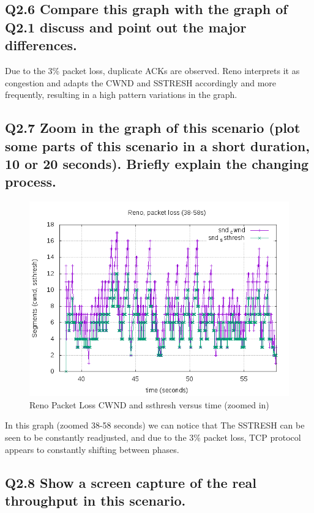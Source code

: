 \documentclass{article}
\begin{document}
\subsection{Q2.6 Compare this graph with the graph of Q2.1 discuss and point out the major differences.}

Due to the 3\% packet loss, duplicate ACKs are observed. Reno interprets it as congestion and adapts the CWND and SSTRESH accordingly and more frequently, resulting in a high pattern variations in the graph.

\subsection{Q2.7 Zoom in the graph of this scenario (plot some parts of this scenario in a short duration, 10 or 20 seconds). Briefly explain the changing process.}

\begin{figure}[H]
\centering
\includegraphics[width=12cm]{figures/RenoPLcwndZoom.png}
\caption{Reno Packet Loss CWND and ssthresh versus time (zoomed in)}
\end{figure}

In this graph (zoomed 38-58 seconds) we can notice that The SSTRESH can be seen to be constantly readjusted, and due to the 3\% packet loss, TCP protocol appears to constantly shifting between phases.






\subsection{Q2.8 Show a screen capture of the real throughput in this
scenario.}
\end{document}
